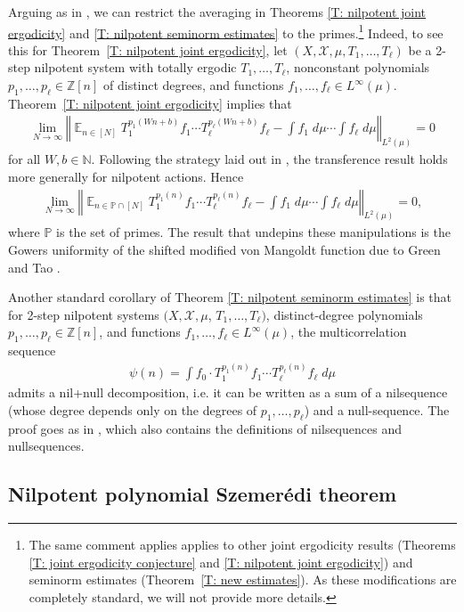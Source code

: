 \documentclass[11pt]{amsart}
\theoremstyle{definition}
\DeclareMathOperator*{\E}{\mathbb{E}}
\newcommand{\N}{{\mathbb N}}
\renewcommand{\P}{{\mathbb P}}
\newcommand{\Z}{{\mathbb Z}}
\newcommand{\CX}{{\mathcal X}}
\newcommand{\norm}[1]{\left\Vert #1\right\Vert}
\newcommand{\1}{{\mathbf{1}}}
\begin{document}
Arguing as in \cite{FHK10}, we can restrict the averaging in Theorems \ref{T: nilpotent joint ergodicity} and \ref{T: nilpotent seminorm estimates} to the primes.\footnote{The same comment applies applies to other joint ergodicity results (Theorems \ref{T: joint ergodicity conjecture} and \ref{T: nilpotent joint ergodicity}) and seminorm estimates (Theorem~\ref{T: new estimates}). As these modifications are completely standard, we will not provide more details.} Indeed, to see this for Theorem~\ref{T: nilpotent joint ergodicity}, let $(X, \CX, \mu, T_1, \ldots, T_\ell)$ be a 2-step nilpotent system with totally ergodic $T_1, \ldots, T_\ell$, nonconstant polynomials $p_1, \ldots, p_\ell\in\Z[n]$ of distinct degrees, and functions $f_1, \ldots, f_\ell\in L^\infty(\mu)$. Theorem~\ref{T: nilpotent joint ergodicity} implies that
    \begin{align}
    \lim_{N\to\infty}\norm{\E_{n\in[N]}T_1^{p_1(Wn+b)}f_1\cdots T_\ell^{p_\ell(Wn+b)}f_\ell - \int f_1\; d\mu\cdots \int f_\ell\; d\mu}_{L^2(\mu)} = 0
\end{align}
for all $W,b\in\N.$ Following the strategy laid out in \cite[Subsection~1.3]{FHK10}, the transference result \cite[Theorem~1.3]{FHK10} holds more generally for nilpotent actions. Hence
\begin{align}
    \lim_{N\to\infty}\norm{\E_{n\in\P\cap [N]}T_1^{p_1(n)}f_1\cdots T_\ell^{p_\ell(n)}f_\ell - \int f_1\; d\mu\cdots \int f_\ell\; d\mu}_{L^2(\mu)} = 0,
\end{align}
where $\P$ is the set of primes. The result that undepins these manipulations is the Gowers uniformity of the shifted modified von Mangoldt function due to Green and Tao \cite{GT10b, GT12b}.

{Another standard corollary of Theorem \ref{T: nilpotent seminorm estimates} is that for 2-step nilpotent systems $(X, \CX, \mu$, $T_1, \ldots, T_\ell)$, distinct-degree polynomials $p_1, \ldots, p_\ell\in\Z[n]$, and functions $f_1, \ldots, f_\ell\in L^\infty(\mu)$, the multicorrelation sequence 
\begin{align*}
    \psi(n) = \int f_0 \cdot T_1^{p_1(n)}f_1 \cdots T_\ell^{p_\ell(n)}f_\ell\; d\mu
\end{align*}
admits a nil+null decomposition, i.e. it can be written as a sum of a nilsequence (whose degree depends only on the degrees of $p_1, \ldots, p_\ell$) and a null-sequence. The proof goes as in \cite[Section 2.6]{FrKu22a}, which also contains the definitions of nilsequences and nullsequences.} 

\subsection{Nilpotent polynomial Szemer\'edi theorem}
\end{document}
